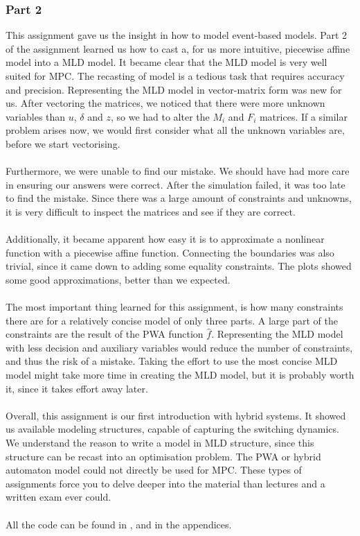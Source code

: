 \subsubsection*{Part 2}
This assignment gave us the insight in how to model event-based models. Part 2 of the assignment learned us how to cast a, for us more intuitive, piecewise affine model into a MLD model. It became clear that the MLD model is very well suited for MPC. The recasting of model is a tedious task that requires accuracy and precision. Representing the MLD model in vector-matrix form was new for us. After vectoring the matrices, we noticed that there were more unknown variables than $u$, $\delta$ and $z$, so we had to alter the $M_i$ and $F_i$ matrices. If a similar problem arises now, we would first consider what all the unknown variables are, before we start vectorising.\\
\\
Furthermore, we were unable to find our mistake. We should have had more care in ensuring our answers were correct. After the simulation failed, it was too late to find the mistake. Since there was a large amount of constraints and unknowns, it is very difficult to inspect the matrices and see if they are correct.\\
\\
Additionally, it became apparent how easy it is to approximate a nonlinear function with a piecewise affine function. Connecting the boundaries was also trivial, since it came down to adding some equality constraints. The plots showed some good approximations, better than we expected.\\
\\
The most important thing learned for this assignment, is how many constraints there are for a relatively concise model of only three parts. A large part of the constraints are the result of the PWA function $\hat{f}$. Representing the MLD model with less decision and auxiliary variables would reduce the number of constraints, and thus the risk of a mistake. Taking the effort to use the most concise MLD model might take more time in creating the MLD model, but it is probably worth it, since it takes effort away later.\\
\\
Overall, this assignment is our first introduction with hybrid systems. It showed us available modeling structures, capable of capturing the switching dynamics. We understand the reason to write a model in MLD structure, since this structure can be recast into an optimisation problem. The PWA or hybrid automaton model could not directly be used for MPC. These types of assignments force you to delve deeper into the material than lectures and a written exam ever could.\\
\\
All the code can be found in \cite{GIT}, and in the appendices.
